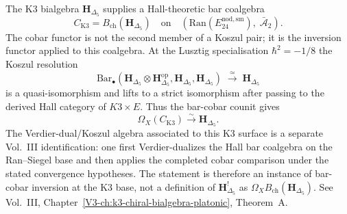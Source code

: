 \begin{remark}
\label{rem:kps-1}
The K3 bialgebra $\mathbf H_{\Delta_5}$ supplies a Hall-theoretic
bar coalgebra
\[
C_{\mathrm{K3}} = B_{\mathrm{ch}}(\mathbf H_{\Delta_5})
\quad\text{on}\quad
(\mathrm{Ran}(E^{\mathrm{nod,sm}}_{24}),\; \bar{\mathcal A}_2).
\]
The cobar functor is not the second member of a Koszul pair; it is
the inversion functor applied to this coalgebra.  At the Lusztig
specialisation $\hbar^2=-1/8$ the Koszul resolution
\[
\mathrm{Bar}_\bullet(\mathbf H_{\Delta_5}\otimes \mathbf H_{\Delta_5}^{\mathrm{op}}, \mathbf H_{\Delta_5}, \mathbf H_{\Delta_5}) \;\xrightarrow{\;\simeq\;}\; \mathbf H_{\Delta_5}
\]
is a quasi-isomorphism and lifts to a strict isomorphism after
passing to the derived Hall category of $K3\times E$.  Thus the
bar-cobar counit gives
\[
 \Omega_X(C_{\mathrm{K3}})\xrightarrow{\sim}\mathbf H_{\Delta_5}.
\]
The Verdier-dual/Koszul algebra associated to this K3 surface is a
separate Vol.~III identification: one first Verdier-dualizes the Hall
bar coalgebra on the Ran--Siegel base and then applies the completed
cobar comparison under the stated convergence hypotheses.  The
statement is therefore an instance of bar-cobar inversion at the K3
base, not a definition of $\mathbf H_{\Delta_5}^!$ as
$\Omega_X B_{\mathrm{ch}}(\mathbf H_{\Delta_5})$. See Vol.~III,
Chapter~\ref{V3-ch:k3-chiral-bialgebra-platonic}, Theorem~A.
\end{remark}
